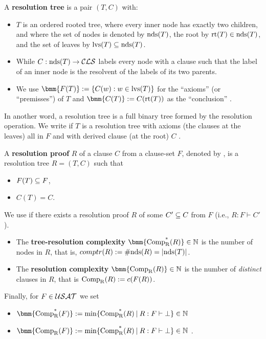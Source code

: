 \documentclass[]{book}
\begin{document}
\begin{defi}\label{def:restree}
  A \textbf{resolution tree} is a pair $(T,C)$ with:
  \begin{itemize}
  \item $T$ is an ordered rooted tree, where every inner node has exactly two children, and where the set of nodes is denoted 
  by $\operatorname{nds}(T)$, the root by $\operatorname{rt}(T) \in \operatorname{nds}(T)$, and the set of leaves by $\operatorname{lvs}(T) \subseteq \operatorname{nds}(T)$.
  \item While $C: \operatorname{nds}(T) \rightarrow \mathcal{CLS}$ labels every node with a clause such that the label of an inner node is the resolvent of the labels of its two parents.
  \item We use $\bmm{F(T)} := \set{C(w) : w \in \lvs(T)}$ for the ``axioms'' (or ``premisses'') of $T$ and $\bmm{C(T)} := C(\rt(T))$ as the ``conclusion'' \cite{h5}.
  \end{itemize}
\end{defi}
In another word, a resolution tree is a full binary tree formed by the resolution operation. We write  if $T$ is a 
resolution tree with axioms (the clauses at the leaves) all in $F$ and with derived clause (at the root) $C$ \cite{h11}. 
\begin{defi}\label{def:resproof}
  A \textbf{resolution proof} $R$ of a clause $C$ from a clause-set $F$, denoted by , is a resolution tree $R = (T,C)$ such that
  \begin{itemize}
  \item $F(T) \subseteq F$,
  \item $C(T) = C$.
  \end{itemize}
  We use  if there exists a resolution proof $R$ of some $C' \subseteq C$ from $F$ (i.e., $R: F \vdash C'$). 
  \begin{itemize}
  \item The \textbf{tree-resolution complexity} $\bmm{\comptr(R)} \in \NN$ is the number of nodes in $R$, that is, $comptr(R) := \operatorname{\#nds}(R) = \lvert \operatorname{nds}(T) \rvert$.
  \item The \textbf{resolution complexity} $\bmm{\compr(R)} \in \NN$ is the number of \emph{distinct} clauses in $R$, that is $\operatorname{\operatorname{Comp}_R}(R) := c(F(R))$.
  \end{itemize}
  Finally, for $F \in \mathcal{USAT}$ we set
  \begin{itemize}
  \item $\bmm{\comptr(F)} := \min \set{\comptr(R) \mb R : F \vdash \bot} \in \NN$
  \item $\bmm{\compr(F)} := \min \set{\comptr(R) \mb R : F \vdash \bot} \in \NN$ \cite{h5}.
  \end{itemize}
\end{defi}
\end{document}

